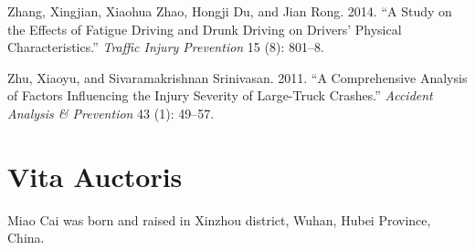 \documentclass[12pt]{book}
\numberwithin{equation}{chapter}
\begin{document}
\leavevmode\hypertarget{ref-zhang2014study}{}%
Zhang, Xingjian, Xiaohua Zhao, Hongji Du, and Jian Rong. 2014. ``A Study on the Effects of Fatigue Driving and Drunk Driving on Drivers' Physical Characteristics.'' \emph{Traffic Injury Prevention} 15 (8): 801--8.

\leavevmode\hypertarget{ref-zhu2011comprehensive}{}%
Zhu, Xiaoyu, and Sivaramakrishnan Srinivasan. 2011. ``A Comprehensive Analysis of Factors Influencing the Injury Severity of Large-Truck Crashes.'' \emph{Accident Analysis \& Prevention} 43 (1): 49--57.

\hypertarget{vita-auctoris}{%
\chapter*{Vita Auctoris}\label{vita-auctoris}}

Miao Cai was born and raised in Xinzhou district, Wuhan, Hubei Province, China.







\backmatter
\printindex
\end{document}
